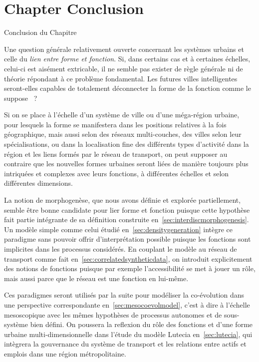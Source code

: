 




\newpage


\section*{Chapter Conclusion}{Conclusion du Chapitre}



Une question générale relativement ouverte concernant les systèmes urbains et celle du \emph{lien entre forme et fonction}. Si, dans certains cas et à certaines échelles, celui-ci est aisément extricable, il ne semble pas exister de règle générale ni de théorie répondant à ce problème fondamental. Les futures villes intelligentes seront-elles capables de totalement déconnecter la forme de la fonction comme le suppose~\cite{batty2017age} ?

Si on se place à l'échelle d'un système de ville ou d'une méga-région urbaine, pour lesquels la forme se manifestera dans les positions relatives à la fois géographique, mais aussi selon des réseaux multi-couches, des villes selon leur spécialisations, ou dans la localisation fine des différents types d'activité dans la région et les liens formés par le réseau de transport, on peut supposer au contraire que les nouvelles formes urbaines seront liées de manière toujours plus intriquées et complexes avec leurs fonctions, à différentes échelles et selon différentes dimensions.

La notion de morphogenèse, que nous avons définie et explorée partiellement, semble être bonne candidate pour lier forme et fonction puisque cette hypothèse fait partie intégrante de sa définition construite en~\ref{sec:interdiscmorphogenesis}. Un modèle simple comme celui étudié en~\ref{sec:densitygeneration} intègre ce paradigme sans pouvoir offrir d'interprétation possible puisque les fonctions sont implicites dans les processus considérés. En couplant le modèle au réseau de transport comme fait en~\ref{sec:correlatedsyntheticdata}, on introduit explicitement des notions de fonctions puisque par exemple l'accessibilité se met à jouer un rôle, mais aussi parce que le réseau est une fonction en lui-même.

Ces paradigmes seront utilisés par la suite pour modéliser la co-évolution dans une perspective correspondante en~\ref{sec:mesocoevolmodel}, c'est à dire à l'échelle mesoscopique avec les mêmes hypothèses de processus autonomes et de sous-système bien défini. On poussera la reflexion du rôle des fonctions et d'une forme urbaine multi-dimensionnelle dans l'étude du modèle Lutecia en~\ref{sec:lutecia}, qui intègrera la gouvernance du système de transport et les relations entre actifs et emplois dans une région métropolitaine.




\stars



